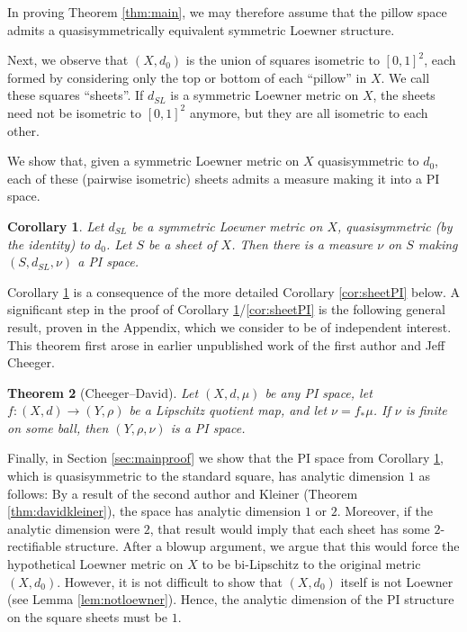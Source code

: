 \documentclass{amsart}
\theoremstyle{plain}
\newtheorem{theorem}{Theorem}
\newtheorem{corollary}[theorem]{Corollary}
\theoremstyle{definition}
\numberwithin{equation}{section}
\numberwithin{theorem}{section}
\begin{document}
In proving Theorem \ref{thm:main}, we may therefore assume that the pillow space admits a quasisymmetrically equivalent symmetric Loewner structure.

Next, we observe that $(X,d_0)$ is the union of squares isometric to $[0,1]^2$, each formed by considering only the top or bottom of each ``pillow'' in $X$. We call these squares ``sheets''. If $d_{SL}$ is a symmetric Loewner metric on $X$, the sheets need not be isometric to $[0,1]^2$ anymore, but they are all isometric to each other.

We show that, given a symmetric Loewner metric on $X$ quasisymmetric to $d_0$, each of these (pairwise isometric) sheets admits a measure making it into a PI space.

\begin{corollary}\label{cor:sheetPIintro}
Let $d_{SL}$ be a symmetric Loewner metric on $X$, quasisymmetric (by the identity) to $d_0$. Let $S$ be a sheet of $X$. Then there is a measure $\nu$ on $S$ making $(S, d_{SL}, \nu)$ a PI space.
\end{corollary}
Corollary \ref{cor:sheetPIintro} is a consequence of the more detailed Corollary \ref{cor:sheetPI} below. A significant step in the proof of Corollary \ref{cor:sheetPIintro}/\ref{cor:sheetPI} is the following general result, proven in the Appendix, which we consider to be of independent interest. This theorem first arose in earlier unpublished work of the first author and Jeff Cheeger.

\begin{theorem}[Cheeger--David]\label{thm:LQ}
Let $(X,d,\mu)$ be any PI space, let $f\colon (X,d)\rightarrow (Y,\rho)$ be a Lipschitz quotient map, and let $\nu = f_{*}\mu$. If $\nu$ is finite on some ball, then $(Y,\rho,\nu)$  is a PI space.
\end{theorem}

Finally, in Section \ref{sec:mainproof} we show that the PI space from Corollary \ref{cor:sheetPIintro}, which is quasisymmetric to the standard square, has analytic dimension $1$ as follows: By a result of the second author and Kleiner (Theorem \ref{thm:davidkleiner}), the space has analytic dimension $1$ or $2$. Moreover, if the analytic dimension were $2$, that result would imply that each sheet has some $2$-rectifiable structure. After a blowup argument, we argue that this would force the hypothetical Loewner metric on $X$ to be bi-Lipschitz to the original metric $(X,d_0)$. However, it is not difficult to show that $(X,d_0)$ itself is not Loewner (see Lemma \ref{lem:notloewner}). Hence, the analytic dimension of the PI structure on the square sheets must be $1$.
\end{document}
